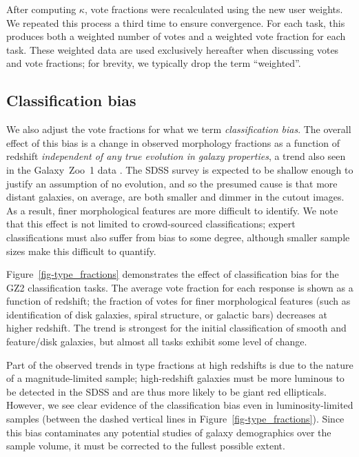 \documentclass[useAMS,usenatbib]{mn2e}
\begin{document}
After computing $\kappa$, vote fractions were recalculated using the new user weights. We repeated this process a third time to ensure convergence. For each task, this produces both a weighted number of votes and a weighted vote fraction for each task. These weighted data are used exclusively hereafter when discussing votes and vote fractions; for brevity, we typically drop the term ``weighted''. 

\subsection{Classification bias}\label{ssec-classificationbias}

We also adjust the vote fractions for what we term {\it classification bias}. The overall effect of this bias is a change in observed morphology fractions as a function of redshift {\em independent of any true evolution in galaxy properties}, a trend also seen in the Galaxy~Zoo~1 data \citep{bam09}. The SDSS survey is expected to be shallow enough to justify an assumption of no evolution, and so the presumed cause is that more distant galaxies, on average, are both smaller and dimmer in the cutout images. As a result, finer morphological features are more difficult to identify. We note that this effect is not limited to crowd-sourced classifications; expert classifications must also suffer from bias to some degree, although smaller sample sizes make this difficult to quantify. 

Figure~\ref{fig-type_fractions} demonstrates the effect of classification bias for the GZ2 classification tasks. The average vote fraction for each response is shown as a function of redshift; the fraction of votes for finer morphological features (such as identification of disk galaxies, spiral structure, or galactic bars) decreases at higher redshift. The trend is strongest for the initial classification of smooth and feature/disk galaxies, but almost all tasks exhibit some level of change. 

Part of the observed trends in type fractions at high redshifts is due to the nature of a magnitude-limited sample; high-redshift galaxies must be more luminous to be detected in the SDSS and are thus more likely to be giant red ellipticals. However, we see clear evidence of the classification bias even in luminosity-limited samples (between the dashed vertical lines in Figure~\ref{fig-type_fractions}). Since this bias contaminates any potential studies of galaxy demographics over the sample volume, it must be corrected to the fullest possible extent. 
\end{document}
